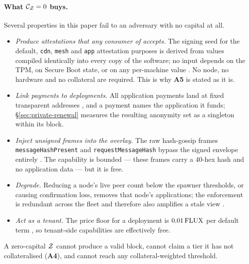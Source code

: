 \paragraph{What $\mathcal{C}_{\mathcal{Z}} = 0$ buys.} \shipped Several properties in this paper fail to an
adversary with no capital at all.
\begin{itemize}
  \item[\textbf{Z1.}] \emph{Produce attestations that any consumer of \fluxsas{} accepts.} The signing seed for the
        default, \texttt{cdn}, \texttt{mesh} and \texttt{app} attestation purposes is derived from
        values compiled identically into every copy of the software; no input depends on the TPM, on
        Secure Boot state, or on any per-machine value
        . No node, no hardware and no
        collateral are required. This is why \textbf{A5} is stated as it is.
  \item[\textbf{Z2.}] \emph{Link payments to deployments.} All application payments land at fixed transparent
        addresses , and a
        payment names the application it funds; \S\ref{sec:private-renewal} measures the resulting
        anonymity set as a singleton within its block.
  \item[\textbf{Z3.}] \emph{Inject unsigned frames into the overlay.} The raw hash-gossip frames
        \texttt{message\allowbreak{}Hash\allowbreak{}Present} and \texttt{request\allowbreak{}Message\allowbreak{}Hash} bypass the signed envelope
        entirely . The capability is
        bounded --- these frames carry a $40$-hex hash and no application data --- but it is free.
  \item[\textbf{Z4.}] \emph{Degrade.} Reducing a node's live peer count below the spawner thresholds, or causing
        confirmation loss, removes that node's applications; the enforcement is redundant across the
        fleet and therefore also amplifies a stale view
        .
  \item[\textbf{Z5.}] \emph{Act as a tenant.} The price floor for a deployment is $0.01\,\mathrm{FLUX}$ per default
        term , so tenant-side
        capabilities are effectively free.
\end{itemize}
A zero-capital $\mathcal{Z}$ cannot produce a valid \PoN{} block, cannot claim a tier it has not
collateralised (\textbf{A4}), and cannot reach any collateral-weighted threshold.

